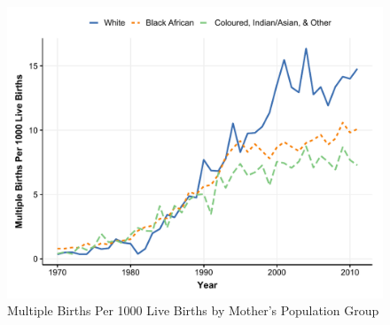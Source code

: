 
\begin{figure}[!th]
\centering
\caption{\label{fig:line-pp}Multiple Births Per 1000 Live Births by Mother's Population Group}
\includegraphics[width=\textwidth]{figures/line_pp.pdf}
\end{figure}

 
\pagebreak



